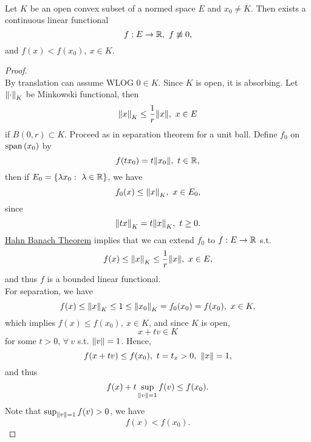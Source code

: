 \begin{theorem}\ \\
Let $K$ be an open convex subset of a normed space $E$ and $x_0 \neq K$. Then exists a continuous linear functional
\begin{equation*}
    f: E \to \mathbb{R},\ f \not\equiv 0,
\end{equation*}
and $f(x) < f(x_0),\ x \in K$.
\end{theorem}
\begin{proof}\ \\
By translation can assume WLOG $0 \in K$. Since $K$ is open, it is absorbing. Let $\norm{\cdot}_K$ be Minkowski functional, then
\begin{equation*}
    \norm{x}_K \leq \frac{1}{r} \norm{x},\ x \in E
\end{equation*}
if $B(0,r) \subset K$. Proceed as in separation theorem for a unit ball. Define $f_0$ on $\operatorname{span}\left(x_0\right)$ by
\begin{equation*}
    f(tx_0) = t\norm{x_0},\ t \in \mathbb{R},
\end{equation*}
then if $E_0 = \{\lambda x_0:\ \lambda \in \mathbb{R}\}$, we have
\begin{equation*}
    f_0(x) \leq \norm{x}_K,\ x \in E_0,
\end{equation*}
since \begin{equation*}
    \norm{tx}_K = t \norm{x}_K,\ t \geq 0.
\end{equation*}
\hyperref[HB thm]{Hahn Banach Theorem} implies that we can extend $f_0$ to $f: E \to \mathbb{R}$ s.t.
\begin{equation*}
    f(x) \leq \norm{x}_K \leq \frac{1}{r} \norm{x},\ x \in E,
\end{equation*}
and thus $f$ is a bounded linear functional.\\
For separation, we have
\begin{equation*}
    f(x) \leq \norm{x}_K \leq 1 \leq \norm{x_0}_K = f_0(x_0) = f(x_0),\ x \in K,
\end{equation*}
which implies $f(x) \leq f(x_0),\ x \in K$, and since $K$ is open,
\begin{equation*}
    x + tv \in K
\end{equation*}
for some $t > 0$, $\forall\ v$ s.t. $\norm{v} = 1$. Hence,
\begin{equation*}
    f(x + tv) \leq f(x_0),\ t = t_x > 0,\ \norm{x} = 1,
\end{equation*}
and thus 
\begin{equation*}
    f(x) + t \sup_{\norm{v} = 1} f(v) \leq f(x_0).
\end{equation*}
Note that $\sup_{\norm{v} = 1} f(v) > 0$, we have
\begin{equation*}
    f(x) < f(x_0).
\end{equation*}
\end{proof}



